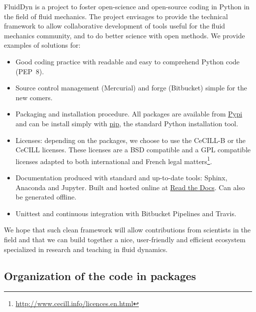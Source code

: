 FluidDyn is a project to foster open-science and open-source coding in Python
in the field of fluid mechanics.
%
The project envisages to provide the technical framework to allow collaborative
development of tools useful for the fluid mechanics community, and to do better
science with open methods.
%
We provide examples of solutions for:
\begin{itemize}
\item Good coding practice with readable and easy to comprehend Python code
(PEP~8).
\item Source control management (Mercurial) and forge (Bitbucket) simple for
the new comers.
\item Packaging and installation procedure. All packages are available from
\href{https://pypi.org/}{Pypi} and can be install simply with
\href{https://pypi.org/project/pip/}{pip}, the standard Python installation
tool.
\item Licenses: depending on the packages, we choose to use the CeCILL-B or the
CeCILL licenses. These licenses are a BSD compatible and a GPL compatible
licenses adapted to both international and French legal
matters\footnote{\url{http://www.cecill.info/licences.en.html}}.
\item Documentation produced with standard and up-to-date tools: Sphinx,
Anaconda and Jupyter. Built and hosted online at
\href{https://readthedocs.org/}{Read the Docs}. Can also be generated offline.
\item Unittest and continuous integration with Bitbucket Pipelines and Travis.
\end{itemize}
We hope that such clean framework will allow contributions from scientists in
the field and that we can build together a nice, user-friendly and efficient
ecosystem specialized in research and teaching in fluid dynamics.



\subsection{Organization of the code in packages}

